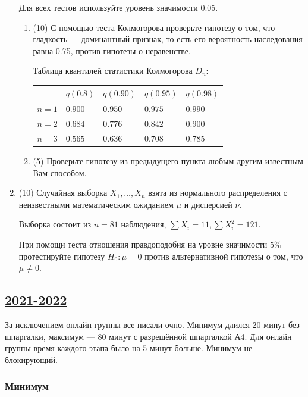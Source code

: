 \begin{enumerate}
Для всех тестов используйте уровень значимости 0.05.

\begin{enumerate}
\item (10) С помощью теста Колмогорова проверьте гипотезу о том, что гладкость — доминантный признак, то есть его вероятность наследования равна 0.75, против гипотезы о неравенстве.

Таблица квантилей статистики Колмогорова $D_n$:

\begin{tabular}{cllll}
\toprule
 & $q(0.8)$ & $q(0.90)$ & $q(0.95)$ & $q(0.98)$\\
\midrule
$n=1$ & $0.900$ & $0.950$ & $0.975$ & $0.990$ \\
$n=2$ & $0.684$ & $0.776$ & $0.842$ & $0.900$ \\
$n=3$ & $0.565$ & $0.636$ & $0.708$ & $0.785$ \\
\bottomrule
\end{tabular}

\item  (5) Проверьте гипотезу из предыдущего пункта любым другим известным Вам способом. 
\end{enumerate}

\item (10) Случайная выборка $X_1, \ldots, X_n$ взята из нормального распределения с неизвестными математическим ожиданием $\mu$ и   дисперсией $\nu$. 

Выборка состоит из $n=81$ наблюдения, $\sum X_i=11, \sum X_i^2=121$. 

При помощи теста отношения правдоподобия на уровне значимости $5 \%$ протестируйте гипотезу $H_0: \mu=0$ против альтернативной гипотезы  о том, что $\mu \neq 0$.

\end{enumerate}



\subsection[2021-2022]{\hyperref[sec:sol_kr_04_2021_2022]{2021-2022}}
\label{sec:kr_04_2021_2022}

За исключением онлайн группы все писали очно. Минимум длился 20 минут без шпаргалки, максимум — 80 минут с разрешённой шпаргалкой А4. 
Для онлайн группы время каждого этапа было на 5 минут больше. Минимум не блокирующий. 

\subsubsection*{Минимум}


